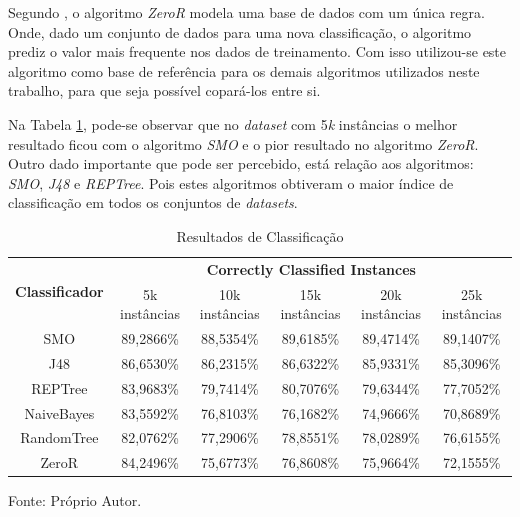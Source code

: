 \documentclass[
	12pt,				%
	openright,			%
	oneside,	
	a4paper,				%
	english,				%
	brazil				%
]{abntex2/abntex2} %
\begin{document}
	Segundo \cite{witten:2011}, o algoritmo \textit{ZeroR} modela uma base de dados com um única regra. Onde, dado um conjunto de dados para uma nova classificação, o algoritmo prediz o valor mais frequente nos dados de treinamento. Com isso utilizou-se este algoritmo como base de referência para os demais algoritmos utilizados neste trabalho, para que seja possível copará-los entre si.
	
	Na Tabela \ref{tabResultadosClassificacao}, pode-se observar que no \textit{dataset} com 5\textit{k} instâncias o melhor resultado ficou com o algoritmo \textit{SMO} e o pior resultado no algoritmo \textit{ZeroR}. Outro dado importante que pode ser percebido, está relação aos algoritmos: \textit{SMO}, \textit{J48} e \textit{REPTree}. Pois estes algoritmos obtiveram o maior índice de classificação em todos os conjuntos de \textit{datasets}.
	\\
	
	\begin{table}[!htb]
		\centering
		\caption{Resultados de Classificação}
		\label{tabResultadosClassificacao}
		\begin{flushleft}
		\renewcommand{\arraystretch}{2}	
		\begin{tabular}{cccccc}
			\hline
			\multicolumn{1}{c|}{\multirow{2}{*}{\textbf{Classificador}}} & \multicolumn{5}{c}{\textbf{Correctly Classified Instances}}                       \\ \cline{2-6} 
			\multicolumn{1}{c|}{}                                        & 5k instâncias & 10k instâncias & 15k instâncias & 20k instâncias & 25k instâncias \\ \hline
			SMO                                                          & 89,2866\%     & 88,5354\%      & 89,6185\%      & 89,4714\%      & 89,1407\%      \\
			J48                                                          & 86,6530\%      & 86,2315\%      & 86,6322\%      & 85,9331\%      & 85,3096\%      \\
			REPTree                                                      & 83,9683\%     & 79,7414\%      & 80,7076\%      & 79,6344\%      & 77,7052\%      \\
			NaiveBayes                                                   & 83,5592\%     & 76,8103\%      & 76,1682\%      & 74,9666\%      & 70,8689\%      \\
			RandomTree                                                   & 82,0762\%     & 77,2906\%      & 78,8551\%      & 78,0289\%      & 76,6155\%      \\
			ZeroR                                                        & 84,2496\%     & 75,6773\%      & 76,8608\%      & 75,9664\%      & 72,1555\%      \\ \hline
		\end{tabular}
	\end{flushleft}
	\begin{flushleft}
	{\fontsize{10}{\baselineskip} \selectfont Fonte: Próprio Autor.}
	\end{flushleft}
	\end{table}
	
\end{document}
